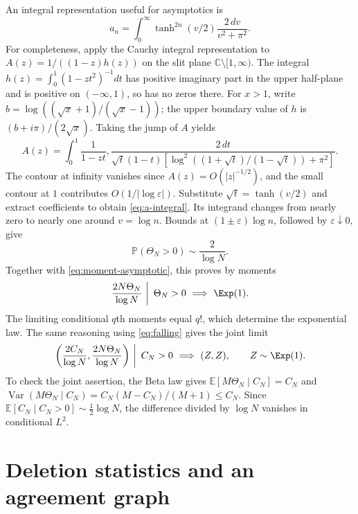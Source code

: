 \documentclass[11pt,letterpaper]{article}
\newcommand{\PP}{\mathbb P}\newcommand{\EE}{\mathbb E}
\begin{document}
An integral representation useful for asymptotics is
\begin{equation}\label{eq:a-integral}
 a_n=\int_0^\infty \tanh^{2n}(v/2)\frac{2\,dv}{v^2+\pi^2}.
\end{equation}
For completeness, apply the Cauchy integral representation to
$A(z)=1/((1-z)h(z))$ on the slit plane $\mathbb C\setminus[1,\infty)$.
The integral $h(z)=\int_0^1(1-zt^2)^{-1}dt$ has positive imaginary part in
the upper half-plane and is positive on $(-\infty,1)$, so has no zeros
there. For $x>1$, write $b=\log((\sqrt x+1)/(\sqrt x-1))$; the upper boundary
value of $h$ is $(b+i\pi)/(2\sqrt x)$. Taking the jump of $A$ yields
\[
 A(z)=\int_0^1\frac{1}{1-zt},
 \frac{2\,dt}{\sqrt t(1-t)
 [\log^2((1+\sqrt t)/(1-\sqrt t))+\pi^2]}.
\]
The contour at infinity vanishes since $A(z)=O(|z|^{-1/2})$, and the
small contour at $1$ contributes $O(1/|\log\varepsilon|)$.
Substitute $\sqrt t=\tanh(v/2)$ and extract coefficients to obtain
\eqref{eq:a-integral}. Its integrand changes from nearly zero to nearly one
around $v=\log n$. Bounds at $(1\pm\varepsilon)\log n$, followed by
$\varepsilon\downarrow0$, give
\begin{equation}\label{eq:positive-asymptotic}
 \PP(\Theta_N>0)\sim\frac{2}{\log N}.
\end{equation}
Together with \eqref{eq:moment-asymptotic}, this proves by moments
\begin{equation}\label{eq:conditional-exp}
 \left.\frac{2N\Theta_N}{\log N}\ \right|\ \Theta_N>0
 \ \Longrightarrow\ \Exp(1).
\end{equation}
The limiting conditional $q$th moments equal $q!$, which determine the
exponential law. The same reasoning using \eqref{eq:falling} gives the
joint limit
\begin{equation}\label{eq:joint-limit}
 \left.\left(\frac{2C_N}{\log N},\frac{2N\Theta_N}{\log N}\right)
 \ \right|\ C_N>0\ \Longrightarrow\ (Z,Z),\qquad Z\sim\Exp(1).
\end{equation}
To check the joint assertion, the Beta law gives
$\EE[M\Theta_N\mid C_N]=C_N$ and
$\operatorname{Var}(M\Theta_N\mid C_N)=C_N(M-C_N)/(M+1)\le C_N$.
Since $\EE[C_N\mid C_N>0]\sim\tfrac12\log N$, the difference divided by
$\log N$ vanishes in conditional $L^2$.

\section{Deletion statistics and an agreement graph}\label{sec:matching}
\end{document}
